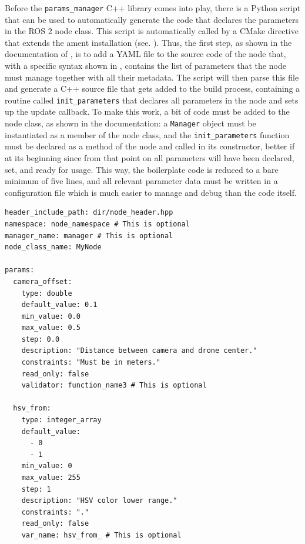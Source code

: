 Before the \texttt{params\_manager} C++ library comes into play, there is a Python script that can be used to automatically generate the code that declares the parameters in the ROS 2 node class. This script is automatically called by a CMake directive that extends the ament installation (see. ). Thus, the first step, as shown in the documentation of \cite{masocco_params_manager_nodate}, is to add a YAML file to the source code of the node that, with a specific syntax shown in , contains the list of parameters that the node must manage together with all their metadata. The script will then parse this file and generate a C++ source file that gets added to the build process, containing a routine called \texttt{init\_parameters} that declares all parameters in the node and sets up the update callback. To make this work, a bit of code must be added to the node class, as shown in the documentation: a \texttt{Manager} object must be instantiated as a member of the node class, and the \texttt{init\_parameters} function must be declared as a method of the node and called in its constructor, better if at its beginning since from that point on all parameters will have been declared, set, and ready for usage. This way, the boilerplate code is reduced to a bare minimum of five lines, and all relevant parameter data must be written in a configuration file which is much easier to manage and debug than the code itself.
\begin{center}
\begin{minipage}[t]{.9\textwidth}
\begin{lstlisting}[caption={Example of \texttt{params\_manager} YAML configuration file \cite{masocco_params_manager_nodate}.}, label={lst:paramsmanager}]
header_include_path: dir/node_header.hpp
namespace: node_namespace # This is optional
manager_name: manager # This is optional
node_class_name: MyNode

params:
  camera_offset:
    type: double
    default_value: 0.1
    min_value: 0.0
    max_value: 0.5
    step: 0.0
    description: "Distance between camera and drone center."
    constraints: "Must be in meters."
    read_only: false
    validator: function_name3 # This is optional

  hsv_from:
    type: integer_array
    default_value:
      - 0
      - 1
    min_value: 0
    max_value: 255
    step: 1
    description: "HSV color lower range."
    constraints: "."
    read_only: false
    var_name: hsv_from_ # This is optional
\end{lstlisting}
\end{minipage}
\end{center}

